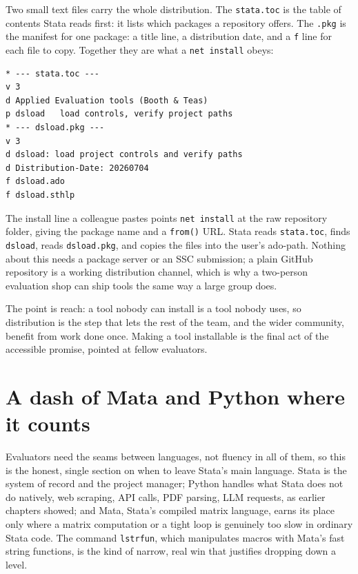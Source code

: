 \documentclass[
    a4paper,
    fontsize=10pt,
    twoside=true,
    numbers=noenddot,
]{kaobook}
\begin{document}
Two small text files carry the whole distribution. The \texttt{stata.toc} is the table of contents Stata reads first: it lists which packages a repository offers. The \texttt{.pkg} is the manifest for one package: a title line, a distribution date, and a \texttt{f} line for each file to copy. Together they are what a \texttt{net install} obeys:
{\footnotesize
\begin{verbatim}
* --- stata.toc ---
v 3
d Applied Evaluation tools (Booth & Teas)
p dsload   load controls, verify project paths
* --- dsload.pkg ---
v 3
d dsload: load project controls and verify paths
d Distribution-Date: 20260704
f dsload.ado
f dsload.sthlp
\end{verbatim}
}
The install line a colleague pastes points \texttt{net install} at the raw repository folder, giving the package name and a \texttt{from()} URL. Stata reads \texttt{stata.toc}, finds \texttt{dsload}, reads \texttt{dsload.pkg}, and copies the files into the user's ado-path. Nothing about this needs a package server or an SSC submission; a plain GitHub repository is a working distribution channel, which is why a two-person evaluation shop can ship tools the same way a large group does.

The point is reach: a tool nobody can install is a tool nobody uses, so distribution is the step that lets the rest of the team, and the wider community, benefit from work done once. Making a tool installable is the final act of the accessible promise, pointed at fellow evaluators.

\section{A dash of Mata and Python where it counts}
Evaluators need the seams between languages, not fluency in all of them, so this is the honest, single section on when to leave Stata's main language. Stata is the system of record and the project manager; Python handles what Stata does not do natively, web scraping, API calls, PDF parsing, LLM requests, as earlier chapters showed; and Mata, Stata's compiled matrix language, earns its place only where a matrix computation or a tight loop is genuinely too slow in ordinary Stata code. The command \texttt{lstrfun}, which manipulates macros with Mata's fast string functions, is the kind of narrow, real win that justifies dropping down a level.
\end{document}
